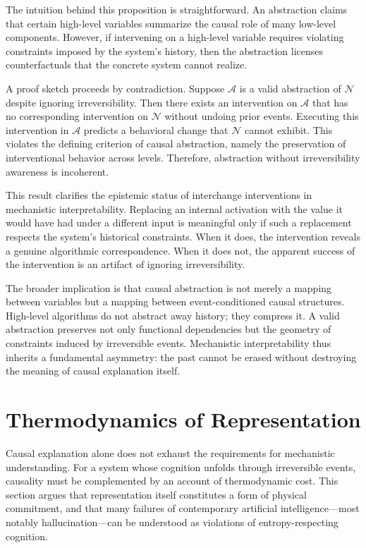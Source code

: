 \documentclass[11pt]{article}
\begin{document}
The intuition behind this proposition is straightforward. An abstraction claims
that certain high-level variables summarize the causal role of many low-level
components. However, if intervening on a high-level variable requires violating
constraints imposed by the system’s history, then the abstraction licenses
counterfactuals that the concrete system cannot realize.

A proof sketch proceeds by contradiction. Suppose $\mathcal{A}$ is a valid
abstraction of $\mathcal{N}$ despite ignoring irreversibility. Then there exists
an intervention on $\mathcal{A}$ that has no corresponding intervention on
$\mathcal{N}$ without undoing prior events. Executing this intervention in
$\mathcal{A}$ predicts a behavioral change that $\mathcal{N}$ cannot exhibit.
This violates the defining criterion of causal abstraction, namely the
preservation of interventional behavior across levels. Therefore, abstraction
without irreversibility awareness is incoherent.

This result clarifies the epistemic status of interchange interventions in
mechanistic interpretability. Replacing an internal activation with the value it
would have had under a different input is meaningful only if such a replacement
respects the system’s historical constraints. When it does, the intervention
reveals a genuine algorithmic correspondence. When it does not, the apparent
success of the intervention is an artifact of ignoring irreversibility.

The broader implication is that causal abstraction is not merely a mapping
between variables but a mapping between event-conditioned causal structures.
High-level algorithms do not abstract away history; they compress it. A valid
abstraction preserves not only functional dependencies but the geometry of
constraints induced by irreversible events. Mechanistic interpretability thus
inherits a fundamental asymmetry: the past cannot be erased without destroying
the meaning of causal explanation itself.

\section{Thermodynamics of Representation}

Causal explanation alone does not exhaust the requirements for mechanistic
understanding. For a system whose cognition unfolds through irreversible events,
causality must be complemented by an account of thermodynamic cost. This section
argues that representation itself constitutes a form of physical commitment,
and that many failures of contemporary artificial intelligence—most notably
hallucination—can be understood as violations of entropy-respecting cognition.
\end{document}
